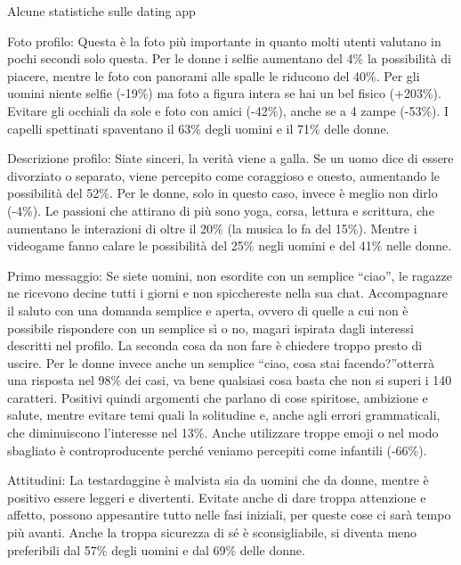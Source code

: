 \documentclass[12pt]{book} %
\begin{document}
\begin{mdframed}[linewidth=1pt]
Alcune statistiche sulle dating app

Foto profilo: Questa è la foto più importante in quanto molti utenti valutano in pochi secondi solo questa. Per le donne
i selfie aumentano del 4\% la possibilità di piacere, mentre le foto con panorami alle spalle le riducono del 40\%. Per
gli uomini niente selfie (-19\%) ma foto a figura intera se hai un bel fisico (+203\%). Evitare gli occhiali da sole e
foto con amici (-42\%), anche se a 4 zampe (-53\%). I capelli spettinati spaventano il 63\% degli uomini e il 71\%
delle donne. 

Descrizione profilo: Siate sinceri, la verità viene a galla. Se un uomo dice di essere divorziato o separato, viene
percepito come coraggioso e onesto, aumentando le possibilità del 52\%. Per le donne, solo in questo caso, invece è
meglio non dirlo (-4\%). Le passioni che attirano di più sono yoga, corsa, lettura e scrittura, che aumentano le
interazioni di oltre il 20\% (la musica lo fa del 15\%). Mentre i videogame fanno calare le possibilità del 25\% negli
uomini e del 41\% nelle donne.

Primo messaggio: Se siete uomini, non esordite con un semplice “ciao”, le ragazze ne ricevono decine tutti i giorni e
non spicchereste nella sua chat. Accompagnare il saluto con una domanda semplice e aperta, ovvero di quelle a cui non è
possibile rispondere con un semplice sì o no, magari ispirata dagli interessi descritti nel profilo. La seconda cosa da
non fare è chiedere troppo presto di uscire. Per le donne invece anche un semplice “ciao, cosa stai facendo?”otterrà
una risposta nel 98\% dei casi, va bene qualsiasi cosa basta che non si superi i 140 caratteri. Positivi quindi
argomenti che parlano di cose spiritose, ambizione e salute, mentre evitare temi quali la solitudine e, anche agli
errori grammaticali, che diminuiscono l'interesse nel 13\%. Anche utilizzare troppe emoji o nel modo sbagliato è
controproducente perché veniamo percepiti come infantili (-66\%).

Attitudini: La testardaggine è malvista sia da uomini che da donne, mentre è positivo essere leggeri e divertenti.
Evitate anche di dare troppa attenzione e affetto, possono appesantire tutto nelle fasi iniziali, per queste cose ci
sarà tempo più avanti. Anche la troppa sicurezza di sé è sconsigliabile, si diventa meno preferibili dal 57\% degli
uomini e dal 69\% delle donne.



\end{mdframed}
\end{document}
